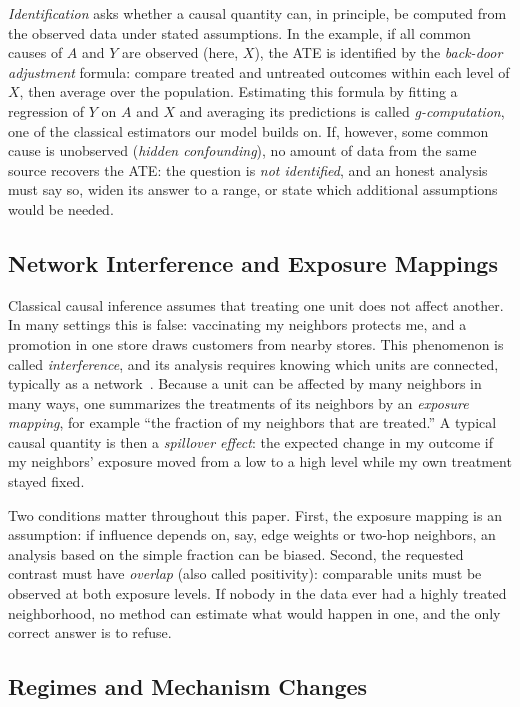 \documentclass[electronics,article,submit,oneauthor]{Definitions/mdpi}
\begin{document}
\emph{Identification} asks whether a causal quantity can, in principle, be computed from the observed data under stated assumptions. In the example, if all common causes of $A$ and $Y$ are observed (here, $X$), the ATE is identified by the \emph{back-door adjustment} formula: compare treated and untreated outcomes within each level of $X$, then average over the population. Estimating this formula by fitting a regression of $Y$ on $A$ and $X$ and averaging its predictions is called \emph{g-computation}, one of the classical estimators our model builds on. If, however, some common cause is unobserved (\emph{hidden confounding}), no amount of data from the same source recovers the ATE: the question is \emph{not identified}, and an honest analysis must say so, widen its answer to a range, or state which additional assumptions would be needed.

\subsection{Network Interference and Exposure Mappings}\label{sec:prelim-interference}

Classical causal inference assumes that treating one unit does not affect another. In many settings this is false: vaccinating my neighbors protects me, and a promotion in one store draws customers from nearby stores. This phenomenon is called \emph{interference}, and its analysis requires knowing which units are connected, typically as a network~\cite{hudgens2008interference}. Because a unit can be affected by many neighbors in many ways, one summarizes the treatments of its neighbors by an \emph{exposure mapping}, for example ``the fraction of my neighbors that are treated.'' A typical causal quantity is then a \emph{spillover effect}: the expected change in my outcome if my neighbors' exposure moved from a low to a high level while my own treatment stayed fixed.

Two conditions matter throughout this paper. First, the exposure mapping is an assumption: if influence depends on, say, edge weights or two-hop neighbors, an analysis based on the simple fraction can be biased. Second, the requested contrast must have \emph{overlap} (also called positivity): comparable units must be observed at both exposure levels. If nobody in the data ever had a highly treated neighborhood, no method can estimate what would happen in one, and the only correct answer is to refuse.

\subsection{Regimes and Mechanism Changes}\label{sec:prelim-regimes}
\end{document}
